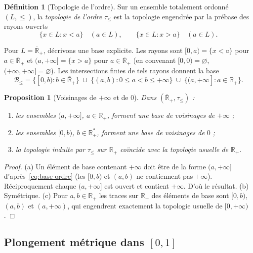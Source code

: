 \documentclass[11pt,a4paper]{article}
\theoremstyle{plain}
\newtheorem{proposition}[theorem]{Proposition}
\theoremstyle{definition}
\newtheorem{definition}[theorem]{Définition}
\newcommand{\Rp}{\mathbb{R}_+}
\newcommand{\Rpb}{\overline{\mathbb{R}}_+}
\begin{document}
\begin{definition}[Topologie de l'ordre]\label{def:ordre}
Sur un ensemble totalement ordonné $(L,\le)$, la \emph{topologie de l'ordre}
$\tau_{\le}$ est la topologie engendrée par la prébase des rayons ouverts
\[
\{x\in L: x<a\}\quad(a\in L),\qquad \{x\in L: x>a\}\quad(a\in L).
\]
\end{definition}

Pour $L=\Rpb$, décrivons une base explicite. Les rayons sont
$[0,a)=\{x<a\}$ pour $a\in\Rpb$ et $(a,+\infty]=\{x>a\}$ pour $a\in\Rpb$
(en convenant $[0,0)=\varnothing$, $(+\infty,+\infty]=\varnothing$). Les
intersections finies de tels rayons donnent la base
\begin{equation}\label{eq:base-ordre}
\mathcal{B}_{\le}=\big\{[0,b): b\in\Rpb\big\}\;\cup\;
\big\{(a,b): 0\le a<b\le+\infty\big\}\;\cup\;
\big\{(a,+\infty]: a\in\Rp\big\}.
\end{equation}

\begin{proposition}[Voisinages de $+\infty$ et de $0$]\label{prop:vois}
Dans $(\Rpb,\tau_{\le})$ :
\begin{enumerate}[label=(\alph*)]
\item les ensembles $(a,+\infty]$, $a\in\Rp$, forment une base de voisinages
de $+\infty$ ;
\item les ensembles $[0,b)$, $b\in\Rp^*$, forment une base de voisinages
de $0$ ;
\item la topologie induite par $\tau_{\le}$ sur $\Rp$ coïncide avec la
topologie usuelle de $\Rp$.
\end{enumerate}
\end{proposition}

\begin{proof}
(a) Un élément de base contenant $+\infty$ doit être de la forme $(a,+\infty]$
d'après~\eqref{eq:base-ordre} (les $[0,b)$ et $(a,b)$ ne contiennent pas
$+\infty$). Réciproquement chaque $(a,+\infty]$ est ouvert et contient
$+\infty$. D'où le résultat. (b) Symétrique. (c) Pour $a,b\in\Rp$ les traces
sur $\Rp$ des éléments de base sont $[0,b)$, $(a,b)$ et $(a,+\infty)$, qui
engendrent exactement la topologie usuelle de $[0,+\infty)$.
\end{proof}

\subsection{Plongement métrique dans $[0,1]$}
\end{document}
